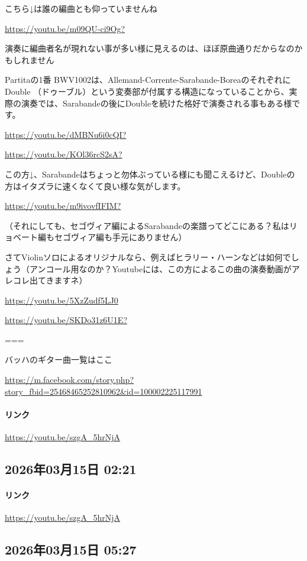 こちら↓は誰の編曲とも仰っていませんね

\url{https://youtu.be/m09QU-ci9Og?}

演奏に編曲者名が現れない事が多い様に見えるのは、ほぼ原曲通りだからなのかもしれません

Partitaの1番 BWV1002は、Allemand-Corrente-Sarabande-BoreaのそれぞれにDouble （ドゥーブル）という変奏部が付属する構造になっていることから、実際の演奏では、Sarabandeの後にDoubleを続けた格好で演奏される事もある様です。

\url{https://youtu.be/dMBNu6i0cQI?}

\url{https://youtu.be/KOl36rcS2sA?}

この方↓、Sarabandeはちょっと勿体ぶっている様にも聞こえるけど、Doubleの方はイタズラに速くなくて良い様な気がします。

\url{https://youtu.be/m9ivovfIFIM?}

（それにしても、セゴヴィア編によるSarabandeの楽譜ってどこにある？私はリョベート編もセゴヴィア編も手元にありません）

さてViolinソロによるオリジナルなら、例えばヒラリー・ハーンなどは如何でしょう（アンコール用なのか？Youtubeには、この方によるこの曲の演奏動画がアレコレ出てきますネ）

\url{https://youtu.be/5XzZudf5LJ0}

\url{https://youtu.be/SKDo31z6U1E?}

===

バッハのギター曲一覧はここ

\url{https://m.facebook.com/story.php?story_fbid=25468465252810962&id=100002225117991}

\paragraph{リンク}
\url{https://youtu.be/szgA_5hrNjA}

\subsection*{2026年03月15日 02:21}

\paragraph{リンク}
\url{https://youtu.be/szgA_5hrNjA}

\subsection*{2026年03月15日 05:27}

